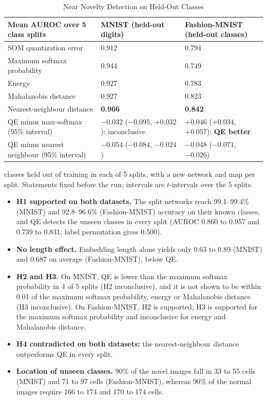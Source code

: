 \documentclass{scrartcl}
\begin{document}
\begin{table}[H]
\centering
\caption{Near Novelty Detection on Held-Out Classes}
\label{tab:near}
\renewcommand{\arraystretch}{1.12}
\footnotesize
\begin{tabular}{|L{0.25\textwidth}|C{0.30\textwidth}|C{0.30\textwidth}|}
\hline
\textbf{Mean AUROC over 5 class splits} & \textbf{MNIST (held-out digits)} & \textbf{Fashion-MNIST (held-out classes)} \\ \hline
SOM quantization error & 0.912 & 0.794 \\ \hline
Maximum softmax probability & 0.944 & 0.749 \\ \hline
Energy & 0.927 & 0.783 \\ \hline
Mahalanobis distance & 0.927 & 0.823 \\ \hline
Nearest-neighbour distance & \textbf{0.966} & \textbf{0.842} \\ \hline
QE minus max-softmax (95\% interval) & $-0.032$ ($-0.095$, $+0.032$): inconclusive & $+0.046$ ($+0.034$, $+0.057$): \textbf{QE better} \\ \hline
QE minus nearest neighbour (95\% interval) & $-0.054$ ($-0.084$, $-0.024$) & $-0.048$ ($-0.071$, $-0.026$) \\ \hline
\end{tabular}

\par\vspace{3pt}
{\footnotesize\raggedright{} classes held out of training in each of 5 splits, with a new network and map per split. Statements fixed before the run; intervals are $t$-intervals over the 5 splits.\par}
\end{table}

\begin{itemize}
  \item \textbf{H1 supported on both datasets.} The split networks reach 99.1--99.4\% (MNIST) and 92.8--96.6\% (Fashion-MNIST) accuracy on their known classes, and QE detects the unseen classes in every split (AUROC 0.860 to 0.957 and 0.739 to 0.831; label permutation gives 0.500).
  \item \textbf{No length effect.} Embedding length alone yields only 0.63 to 0.89 (MNIST) and 0.687 on average (Fashion-MNIST), below QE.
  \item \textbf{H2 and H3.} On MNIST, QE is lower than the maximum softmax probability in 4 of 5 splits (H2 inconclusive), and it is not shown to be within 0.01 of the maximum softmax probability, energy or Mahalanobis distance (H3 inconclusive). On Fashion-MNIST, H2 is supported; H3 is supported for the maximum softmax probability and inconclusive for energy and Mahalanobis distance.
  \item \textbf{H4 contradicted on both datasets:} the nearest-neighbour distance outperforms QE in every split.
  \item \textbf{Location of unseen classes.} 90\% of the novel images fall in 33 to 55 cells (MNIST) and 71 to 97 cells (Fashion-MNIST), whereas 90\% of the normal images require 166 to 174 and 170 to 174 cells.
\end{itemize}
\end{document}
